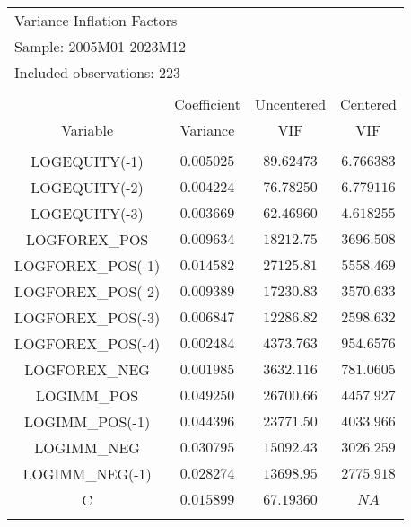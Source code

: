 \begin{tabular}{lrrr}
\multicolumn{2}{l}{Variance Inflation Factors}&\multicolumn{1}{c}{}&\multicolumn{1}{c}{}\\
\multicolumn{2}{l}{Sample: 2005M01 2023M12}&\multicolumn{1}{c}{}&\multicolumn{1}{c}{}\\
\multicolumn{2}{l}{Included observations: 223}&\multicolumn{1}{c}{}&\multicolumn{1}{c}{}\\
[4.5pt] \hline \\ [-4.5pt]
\multicolumn{1}{c}{}&\multicolumn{1}{c}{Coefficient}&\multicolumn{1}{c}{Uncentered}&\multicolumn{1}{c}{Centered}\\
\multicolumn{1}{c}{Variable}&\multicolumn{1}{c}{Variance}&\multicolumn{1}{c}{VIF}&\multicolumn{1}{c}{VIF}\\
[4.5pt] \hline \\ [-4.5pt]
\multicolumn{1}{c}{LOGEQUITY(-1)}&\multicolumn{1}{c}{$0.005025$}&\multicolumn{1}{c}{$89.62473$}&\multicolumn{1}{c}{$6.766383$}\\
\multicolumn{1}{c}{LOGEQUITY(-2)}&\multicolumn{1}{c}{$0.004224$}&\multicolumn{1}{c}{$76.78250$}&\multicolumn{1}{c}{$6.779116$}\\
\multicolumn{1}{c}{LOGEQUITY(-3)}&\multicolumn{1}{c}{$0.003669$}&\multicolumn{1}{c}{$62.46960$}&\multicolumn{1}{c}{$4.618255$}\\
\multicolumn{1}{c}{LOGFOREX\_POS}&\multicolumn{1}{c}{$0.009634$}&\multicolumn{1}{c}{$18212.75$}&\multicolumn{1}{c}{$3696.508$}\\
\multicolumn{1}{c}{LOGFOREX\_POS(-1)}&\multicolumn{1}{c}{$0.014582$}&\multicolumn{1}{c}{$27125.81$}&\multicolumn{1}{c}{$5558.469$}\\
\multicolumn{1}{c}{LOGFOREX\_POS(-2)}&\multicolumn{1}{c}{$0.009389$}&\multicolumn{1}{c}{$17230.83$}&\multicolumn{1}{c}{$3570.633$}\\
\multicolumn{1}{c}{LOGFOREX\_POS(-3)}&\multicolumn{1}{c}{$0.006847$}&\multicolumn{1}{c}{$12286.82$}&\multicolumn{1}{c}{$2598.632$}\\
\multicolumn{1}{c}{LOGFOREX\_POS(-4)}&\multicolumn{1}{c}{$0.002484$}&\multicolumn{1}{c}{$4373.763$}&\multicolumn{1}{c}{$954.6576$}\\
\multicolumn{1}{c}{LOGFOREX\_NEG}&\multicolumn{1}{c}{$0.001985$}&\multicolumn{1}{c}{$3632.116$}&\multicolumn{1}{c}{$781.0605$}\\
\multicolumn{1}{c}{LOGIMM\_POS}&\multicolumn{1}{c}{$0.049250$}&\multicolumn{1}{c}{$26700.66$}&\multicolumn{1}{c}{$4457.927$}\\
\multicolumn{1}{c}{LOGIMM\_POS(-1)}&\multicolumn{1}{c}{$0.044396$}&\multicolumn{1}{c}{$23771.50$}&\multicolumn{1}{c}{$4033.966$}\\
\multicolumn{1}{c}{LOGIMM\_NEG}&\multicolumn{1}{c}{$0.030795$}&\multicolumn{1}{c}{$15092.43$}&\multicolumn{1}{c}{$3026.259$}\\
\multicolumn{1}{c}{LOGIMM\_NEG(-1)}&\multicolumn{1}{c}{$0.028274$}&\multicolumn{1}{c}{$13698.95$}&\multicolumn{1}{c}{$2775.918$}\\
\multicolumn{1}{c}{C}&\multicolumn{1}{c}{$0.015899$}&\multicolumn{1}{c}{$67.19360$}&\multicolumn{1}{c}{$NA$}\\
[4.5pt] \hline \\ [-4.5pt]
\end{tabular}